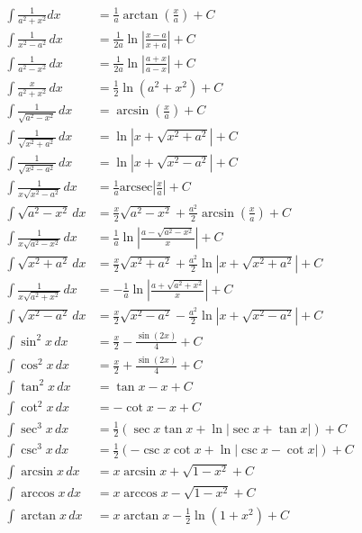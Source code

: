 \documentclass[a4paper,12pt]{ctexart}
\begin{document}
\begin{align*}
\int \frac{1}{a^2 + x^2}dx &= \frac{1}{a}\arctan\left(\frac{x}{a}\right) + C \\
\int \frac{1}{x^2 - a^2} \, dx &= \frac{1}{2a}\ln\left|\frac{x-a}{x+a}\right| + C \\
\int \frac{1}{a^2 - x^2} \, dx &= \frac{1}{2a}\ln\left|\frac{a+x}{a-x}\right| + C \\
\int \frac{x}{a^2 + x^2} \, dx &= \frac{1}{2}\ln(a^2 + x^2) + C \\
\int \frac{1}{\sqrt{a^2 - x^2}} \, dx &= \arcsin\left(\frac{x}{a}\right) + C \\
\int \frac{1}{\sqrt{x^2 + a^2}} \, dx &= \ln|x + \sqrt{x^2 + a^2}| + C \\
\int \frac{1}{\sqrt{x^2 - a^2}} \, dx &= \ln|x + \sqrt{x^2 - a^2}| + C \\
\int \frac{1}{x\sqrt{x^2 - a^2}} \, dx &= \frac{1}{a}\text{arcsec}\left|\frac{x}{a}\right| + C \\
\int \sqrt{a^2 - x^2} \, dx &= \frac{x}{2}\sqrt{a^2 - x^2} + \frac{a^2}{2}\arcsin\left(\frac{x}{a}\right) + C \\
\int \frac{1}{x\sqrt{a^2 - x^2}} \, dx &= \frac{1}{a}\ln\left|\frac{a - \sqrt{a^2 - x^2}}{x}\right| + C \\
\int \sqrt{x^2 + a^2} \, dx &= \frac{x}{2}\sqrt{x^2 + a^2} + \frac{a^2}{2}\ln|x + \sqrt{x^2 + a^2}| + C \\
\int \frac{1}{x\sqrt{a^2 + x^2}} \, dx &= -\frac{1}{a}\ln\left|\frac{a + \sqrt{a^2 + x^2}}{x}\right| + C \\
\int \sqrt{x^2 - a^2} \, dx &= \frac{x}{2}\sqrt{x^2 - a^2} - \frac{a^2}{2}\ln|x + \sqrt{x^2 - a^2}| + C \\
\int \sin^2 x \, dx &= \frac{x}{2} - \frac{\sin(2x)}{4} + C \\
\int \cos^2 x \, dx &= \frac{x}{2} + \frac{\sin(2x)}{4} + C \\
\int \tan^2 x \, dx &= \tan x - x + C \\
\int \cot^2 x \, dx &= -\cot x - x + C \\
\int \sec^3 x \, dx &= \frac{1}{2}(\sec x \tan x + \ln|\sec x + \tan x|) + C \\
\int \csc^3 x \, dx &= \frac{1}{2}(-\csc x \cot x + \ln|\csc x - \cot x|) + C \\
\int \arcsin x \, dx &= x\arcsin x + \sqrt{1-x^2} + C \\
\int \arccos x \, dx &= x\arccos x - \sqrt{1-x^2} + C \\
\int \arctan x \, dx &= x\arctan x - \frac{1}{2}\ln(1+x^2) + C \\

\end{align*}
\end{document}

